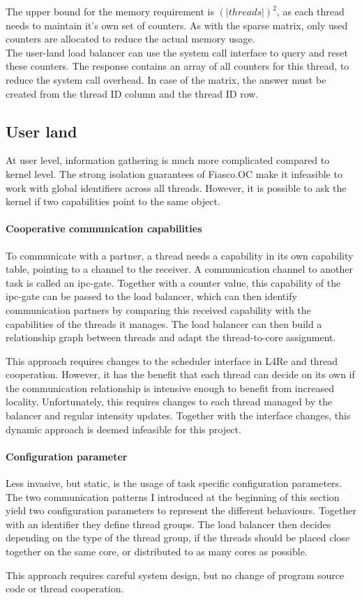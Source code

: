 The upper bound for the memory requirement is $(|threads|)^2$, as each thread
needs to maintain it's own set of counters.
As with the sparse matrix, only used counters are allocated to reduce the
actual memory usage.
\\

The user-land load balancer can use the system call interface to query
and reset these counters.
The response contains an array of all counters for this thread, to reduce the
system call overhead.
In case of the matrix, the answer must be created from the thread ID column and
the thread ID row.


\subsection{User land}
At user level, information gathering is much more complicated compared to
kernel level.
The strong isolation guarantees of Fiasco.OC make it infeasible to work with global
identifiers across all threads.
However, it is possible to ask the kernel if two capabilities point to the
same object.

\paragraph{Cooperative communication capabilities}
To communicate with a partner, a thread needs a capability in its own
capability table, pointing to a channel to the receiver.
A communication channel to another task is called an \gls{ipc}-gate.
Together with a counter value, this capability of the \gls{ipc}-gate can be
passed to the load balancer, which can then identify communication partners by
comparing this received capability with the capabilities of the threads
it manages.
The load balancer can then build a relationship graph between threads and adapt
the thread-to-core assignment.

This approach requires changes to the scheduler interface in L4Re and
thread cooperation.
However, it has the benefit that each thread can decide on its own if the
communication relationship is intensive enough to benefit from increased
locality.
Unfortunately, this requires changes to each thread managed by the balancer and
regular intensity updates.
Together with the interface changes, this dynamic approach is deemed infeasible
for this project.

\paragraph{Configuration parameter}
Less invasive, but static, is the usage of task specific configuration parameters.
The two communication patterns I introduced at the beginning of this section
yield two configuration parameters to represent the different behaviours.
Together with an identifier they define thread groups.
The load balancer then decides depending on the type of the thread group, if
the threads should be placed close together on the same core, or distributed to
as many cores as possible.

This approach requires careful system design, but no change of program source
code or thread cooperation.
